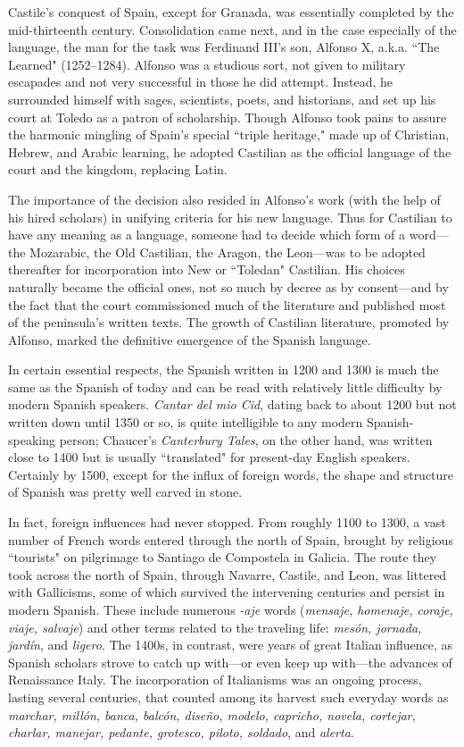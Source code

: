 Castile's conquest of Spain, except for Granada, was essentially completed by the mid-thirteenth century. Consolidation came
next, and in the case especially of the language, the man for the task
was Ferdinand III's son, Alfonso X, a.k.a. ``The Learned" (1252--1284).
Alfonso was a studious sort, not given to military escapades and not
very successful in those he did attempt. Instead, he surrounded himself
with sages, scientists, poets, and historians, and set up his court at Toledo as a patron of scholarship. Though Alfonso took pains to assure
the harmonic mingling of Spain's special ``triple heritage," made up of
Christian, Hebrew, and Arabic learning, he adopted Castilian as the official language of the court and the kingdom, replacing Latin.

The importance of the decision also resided in Alfonso's work
(with the help of his hired scholars) in unifying criteria for his new language. Thus for Castilian to have any meaning as a language, someone
had to decide which form of a word---the Mozarabic, the Old Castilian,
the Aragon, the Leon---was to be adopted thereafter for incorporation
into New or ``Toledan" Castilian. His choices naturally became the official ones, not so much by decree as by consent---and by the fact that
the court commissioned much of the literature and published most of
the peninsula's written texts. The growth of Castilian literature, promoted by Alfonso, marked the definitive emergence of the Spanish
language.

In certain essential respects, the Spanish written in 1200 and
1300 is much the same as the Spanish of today and can be read with
relatively little difficulty by modern Spanish speakers. \emph{Cantar del mio
	Cid}, dating back to about 1200 but not written down until 1350 or so,
is quite intelligible to any modern Spanish-speaking person; Chaucer's
\emph{Canterbury Tales}, on the other hand, was written close to 1400 but
is usually ``translated" for present-day English speakers. Certainly by
1500, except for the influx of foreign words, the shape and structure of
Spanish was pretty well carved in stone.

In fact, foreign influences had never stopped. From roughly
1100 to 1300, a vast number of French words entered through the
north of Spain, brought by religious ``tourists" on pilgrimage to Santiago de Compostela in Galicia. The route they took across the north
of Spain, through Navarre, Castile, and Leon, was littered with Gallicisms, some of which survived the intervening centuries and persist in
modern Spanish. These include numerous \emph{-aje} words (\emph{mensaje, homenaje, coraje, viaje, salvaje}) and other terms related to the traveling life:
\emph{mesón, jornada, jardín}, and \emph{ligero}. The 1400s, in contrast, were years
of great Italian influence, as Spanish scholars strove to catch up with---or even keep up with---the advances of Renaissance Italy. The incorporation of Italianisms was an ongoing process, lasting several centuries,
that counted among its harvest such everyday words as \emph{marchar, millón, banca, balcón, diseño, modelo, capricho, novela, cortejar, charlar,
	manejar, pedante, grotesco, piloto, soldado}, and \emph{alerta}.

